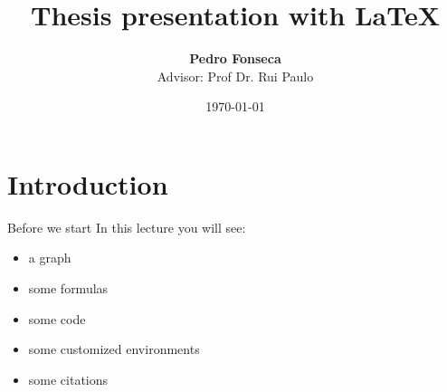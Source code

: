 


\title[Thesis presentation with Latex]{Thesis presentation with \LaTeX}

\author[Pedro Fonseca]{\textbf {Pedro Fonseca} \\ \footnotesize Advisor: Prof Dr. Rui Paulo}

\date{\today}








\section{Introduction}


\begin{frame}{Before we start}
	In this lecture you will see:
	\begin{itemize}
	\item a graph
	\item some formulas
	\item some code
	\item some customized environments
	\item some citations \citep{kass1995}
	\end{itemize}
\end{frame}


